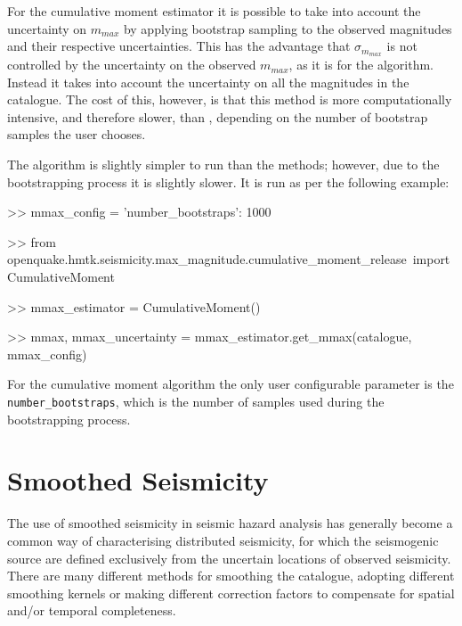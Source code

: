For the cumulative moment estimator it is possible to take into account the uncertainty on $m_{max}$ by applying bootstrap sampling to the observed magnitudes and their respective uncertainties. This has the advantage that $\sigma_{m_{max}}$ is not controlled by the uncertainty on the observed $m_{max}$, as it is for the \textcite{Kijko2004} algorithm. Instead it takes into account the uncertainty on all the magnitudes in the catalogue. The cost of this, however, is that this method is more computationally intensive, and therefore slower, than \textcite{Kijko2004}, depending on the number of bootstrap samples the user chooses.

The algorithm is slightly simpler to run than the \textcite{Kijko2004} methods; however, due to the bootstrapping process it is slightly slower. It is run as per the following example:

\begin{python}[frame=single]

>> mmax_config = {'number_bootstraps': 1000}
                       
>> from openquake.hmtk.seismicity.max_magnitude.cumulative_moment_release\
     import CumulativeMoment

>> mmax_estimator = CumulativeMoment()

>> mmax, mmax_uncertainty = mmax_estimator.get_mmax(catalogue,
                                                    mmax_config)
                
\end{python}

For the cumulative moment algorithm the only user configurable parameter is the \\ \verb=number_bootstraps=, which is the number of samples used during the bootstrapping process. 

\section{Smoothed Seismicity}

The use of smoothed seismicity in seismic hazard analysis has generally become a common way of characterising distributed seismicity, for which the seismogenic source are defined exclusively from the uncertain locations of observed seismicity. There are many different methods for smoothing the catalogue, adopting different smoothing kernels or making different correction factors to compensate for spatial and/or temporal completeness. 

\subsection{\textcite{frankel1995}}

